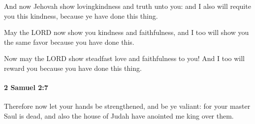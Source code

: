 			\begin{versebox}
					\item[BHS] 
					\item[ASV] And now Jehovah show lovingkindness and truth unto you: and I also will requite you this kindness, because ye have done this thing.
					\item[NIV] May the LORD now show you kindness and faithfulness, and I too will show you the same favor because you have done this.
					\item[NRSV] Now may the LORD show steadfast love and faithfulness to you! And I too will reward you because you have done this thing.
			\end{versebox}

		\paragraph{2 Samuel 2:7} %
			\label{2SAMUEL-2-7}

			Therefore now let your hands be strengthened, and be ye valiant: for your master Saul is dead, and also the house of Judah have anointed me king over them.

